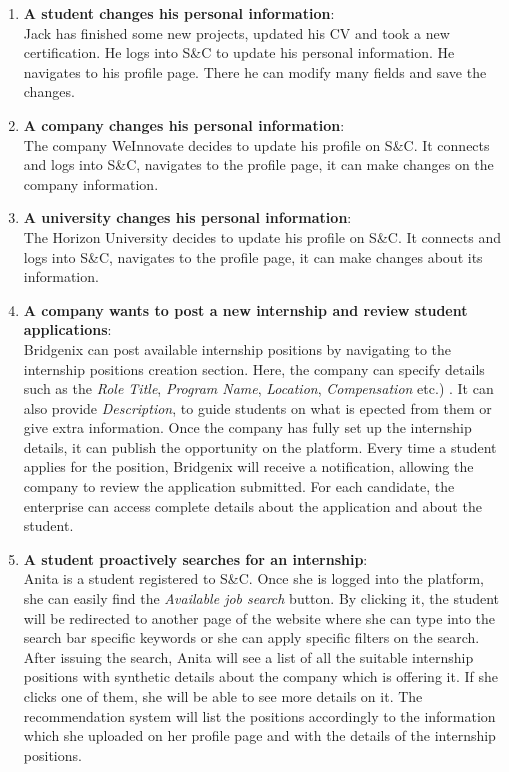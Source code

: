 \begin{enumerate}
            \item \textbf{A student changes his personal information}:
            \\ Jack has finished some new projects, updated his CV and took a new certification. He logs into S\&C to update his personal information. He navigates to his profile page. There he can modify many fields and save the changes. 
            
            \item \textbf{A company changes his personal information}:
            \\ The company WeInnovate decides to update his profile on S\&C. It connects and logs into S\&C, navigates to the profile page, it can make changes on the company information.  

            \item \textbf{A university changes his personal information}:
            \\ The Horizon University decides to update his profile on S\&C.  It connects and logs into S\&C, navigates to the profile page, it can make changes about its information.
            
            \newpage
            \item \textbf{A company wants to post a new internship and review student applications}:
            \\ Bridgenix can post available internship positions by navigating to the internship positions creation section. Here, the company can specify details such as the \textit{ Role Title}, \textit{Program Name}, \textit{Location}, \textit{ Compensation} etc.) .
            It can also provide \textit{Description}, to guide students on what is epected from them or give extra information.
            Once the company has fully set up the internship details, it can publish the opportunity on the platform. 
            Every time a student applies for the position, Bridgenix will receive a notification, allowing the company to review the application submitted. For each candidate, the enterprise can access complete details about the application and about the student.

            
            \item \textbf{A student proactively searches for an internship}:  
            \\Anita is a student registered to S\&C. Once she is logged into the platform, she can easily find the \textit{Available job search} button. By clicking it, the student will be redirected to another page of the website where she can type into the search bar specific keywords or she can apply specific filters on the search. After issuing the search, Anita will see a list of all the suitable internship positions with synthetic details about the company which is offering it. If she clicks one of them, she will be able to see more details on it. The recommendation system will list the positions accordingly to the information which she uploaded on her profile page and with the details of the internship positions.


\end{enumerate}
